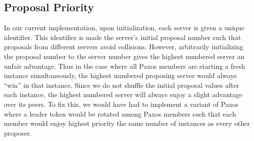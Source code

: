 \documentclass{article}
\begin{document}
\subsection{Proposal Priority}

In our current implementation, upon initialization, each server is given a unique identifier.
This identifier is made the server's initial proposal number such that proposals from different servers avoid collisions.
However, arbitrarily initializing the proposal number to the server number gives the highest numbered server an unfair advantage.
Thus in the case where all Paxos members are starting a fresh instance simultaneously, the highest numbered proposing server would always ``win'' in that instance.
Since we do not shuffle the initial proposal values after each instance, the highest numbered server will always enjoy a slight advantage over its peers.
To fix this, we would have had to implement a variant of Paxos where a leader token would be rotated among Paxos members such that each member would enjoy highest priority the same number of instances as every other proposer.
\end{document}
